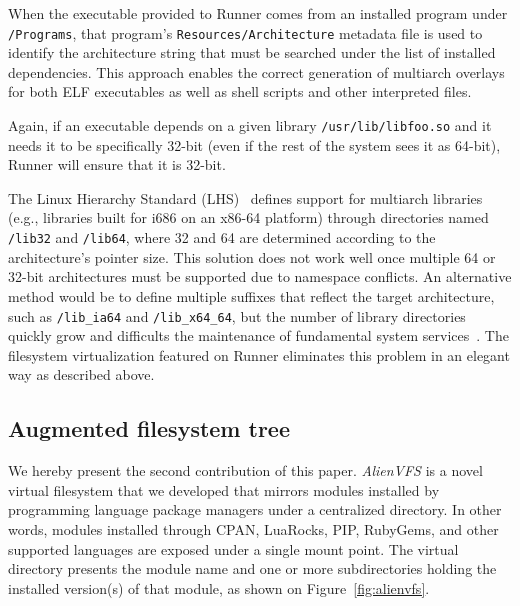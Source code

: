 \documentclass[sigplan, anonymous, 10pt]{acmart}
\begin{document}
When the executable provided to Runner comes from an installed program
under \texttt{/Programs}, that program's \texttt{Resources/Architecture}
metadata file is used to identify the architecture string that must be
searched under the list of installed dependencies. This approach enables
the correct generation of multiarch overlays for both ELF executables as
well as shell scripts and other interpreted files.

Again, if an executable depends on a given library \texttt{/usr/\-lib/lib\-foo.so} and it
needs it to be specifically 32-bit (even if the rest of the system sees it
as 64-bit), Runner will ensure that it is 32-bit.

The Linux Hierarchy Standard (LHS)~\cite{lsb2015:fhs} defines support for
multiarch libraries (e.g., libraries built for i686 on an x86-64 platform)
through directories named \texttt{/lib32} and \texttt{/lib64},
where 32 and 64 are determined according to the architecture's pointer size.
This solution does not work well once multiple 64 or 32-bit architectures must
be supported due to namespace conflicts. An alternative method would be to define
multiple suffixes that reflect the target architecture, such as \texttt{/lib\_ia64}
and \texttt{/lib\_x64\_64}, but the number of library directories quickly grow and
difficults the maintenance of fundamental system services~\cite{heen2005:thesis}.
The filesystem virtualization featured on Runner eliminates this
problem in an elegant way as described above.

\subsection{Augmented filesystem tree}
We hereby present the second contribution of this paper. \textit{AlienVFS} is a novel virtual
filesystem that we developed that mirrors modules installed by programming language
package managers under a centralized directory. In other words, modules installed
through CPAN, LuaRocks, PIP, RubyGems, and other supported languages are exposed under
a single mount point. The virtual directory presents the module name and one or more
subdirectories holding the installed version(s) of that module, as shown on
Figure~\ref{fig:alienvfs}.
\end{document}
